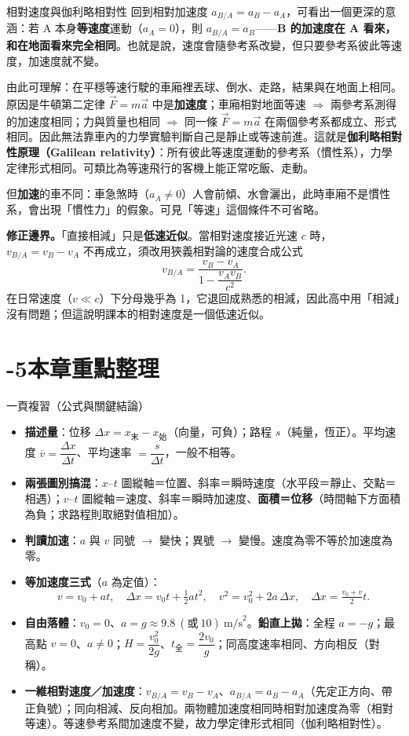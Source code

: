 \documentclass[11pt]{article}
\begin{document}
\begin{延伸框}{相對速度與伽利略相對性}
回到相對加速度 $a_{B/A}=a_B-a_A$，可看出一個更深的意涵：若 A 本身\textbf{等速度}運動（$a_A=0$），則 $a_{B/A}=a_B$——\textbf{B 的加速度在 A 看來，和在地面看來完全相同}。也就是說，速度會隨參考系改變，但只要參考系彼此等速度，加速度就不變。

由此可理解：在平穩等速行駛的車廂裡丟球、倒水、走路，結果與在地面上相同。原因是牛頓第二定律 $\vec F=m\vec a$ 中是\textbf{加速度}；車廂相對地面等速 $\Rightarrow$ 兩參考系測得的加速度相同；力與質量也相同 $\Rightarrow$ 同一條 $\vec F=m\vec a$ 在兩個參考系都成立、形式相同。因此無法靠車內的力學實驗判斷自己是靜止或等速前進。這就是\textbf{伽利略相對性原理（Galilean relativity）}：所有彼此等速度運動的參考系（慣性系），力學定律形式相同。可類比為等速飛行的客機上能正常吃飯、走動。

但\textbf{加速}的車不同：車急煞時（$a_A\ne 0$）人會前傾、水會灑出，此時車廂不是慣性系，會出現「慣性力」的假象。可見「等速」這個條件不可省略。

\textbf{修正邊界。}「直接相減」只是\textbf{低速近似}。當相對速度接近光速 $c$ 時，$v_{B/A}=v_B-v_A$ 不再成立，須改用狹義相對論的速度合成公式
$$v_{B/A}=\frac{v_B-v_A}{1-\dfrac{v_A v_B}{c^2}}.$$
在日常速度（$v\ll c$）下分母幾乎為 1，它退回成熟悉的相減，因此高中用「相減」沒有問題；但這說明課本的相對速度是一個低速近似。
\end{延伸框}

\section*{-5\quad 本章重點整理}

\begin{補充框}{一頁複習（公式與關鍵結論）}
\begin{itemize}\setlength{\itemsep}{2pt}
\item \textbf{描述量}：位移 $\Delta x = x_{\text{末}} - x_{\text{始}}$（向量，可負）；路程 $s$（純量，恆正）。平均速度 $\bar v=\dfrac{\Delta x}{\Delta t}$、平均速率 $=\dfrac{s}{\Delta t}$，一般不相等。
\item \textbf{兩張圖別搞混}：$x\text{–}t$ 圖縱軸＝位置、斜率＝瞬時速度（水平段＝靜止、交點＝相遇）；$v\text{–}t$ 圖縱軸＝速度、斜率＝瞬時加速度、\textbf{面積＝位移}（時間軸下方面積為負；求路程則取絕對值相加）。
\item \textbf{判讀加速}：$a$ 與 $v$ 同號 $\rightarrow$ 變快；異號 $\rightarrow$ 變慢。速度為零不等於加速度為零。
\item \textbf{等加速度三式}（$a$ 為定值）：
$$v=v_0+at,\quad \Delta x=v_0t+\tfrac12at^2,\quad v^2=v_0^2+2a\,\Delta x,\quad \Delta x=\tfrac{v_0+v}{2}t.$$
\item \textbf{自由落體}：$v_0=0$、$a=g\approx 9.8\ (\text{或}\ 10)\ \text{m/s}^2$。\textbf{鉛直上拋}：全程 $a=-g$；最高點 $v=0$、$a\ne 0$；$H=\dfrac{v_0^2}{2g}$、$t_{\text{全}}=\dfrac{2v_0}{g}$；同高度速率相同、方向相反（對稱）。
\item \textbf{一維相對速度／加速度}：$v_{B/A}=v_B-v_A$、$a_{B/A}=a_B-a_A$（先定正方向、帶正負號）；同向相減、反向相加。兩物體加速度相同時相對加速度為零（相對等速）。等速參考系間加速度不變，故力學定律形式相同（伽利略相對性）。
\end{itemize}
\end{補充框}
\end{document}
